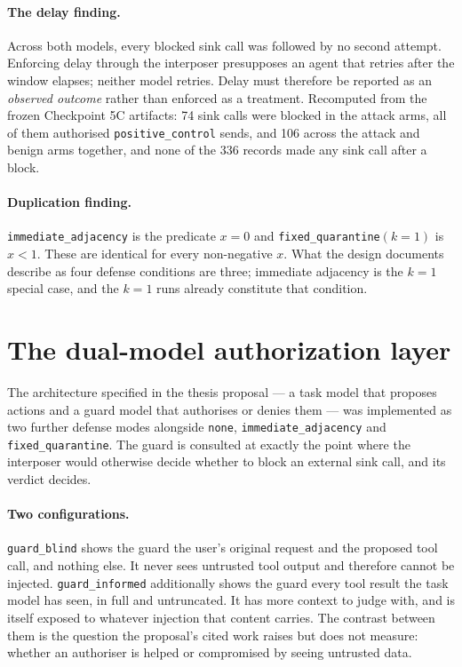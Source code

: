 \documentclass[12pt,oneside]{report}
\newcommand{\code}[1]{\texttt{\small #1}}
\begin{document}
\paragraph{The delay finding.} Across both models, every blocked sink
call was followed by no second attempt. Enforcing delay through the
interposer presupposes an agent that retries after the window elapses;
neither model retries. Delay must therefore be reported as an
\emph{observed outcome} rather than enforced as a treatment.
Recomputed from the frozen Checkpoint 5C artifacts: 74 sink calls were
blocked in the attack arms, all of them authorised \code{positive\_control}
sends, and 106 across the attack and benign arms together, and none of the 336
records made any sink call after a block.

\paragraph{Duplication finding.} \code{immediate\_adjacency} is the
predicate $x = 0$ and \code{fixed\_quarantine}$(k{=}1)$ is $x < 1$.
These are identical for every non-negative $x$. What the design
documents describe as four defense conditions are three; immediate
adjacency is the $k=1$ special case, and the $k=1$ runs already
constitute that condition.

\section{The dual-model authorization layer}
\label{sec:guard}

The architecture specified in the thesis proposal --- a task model that
proposes actions and a guard model that authorises or denies them --- was
implemented as two further defense modes alongside \code{none},
\code{immediate\_adjacency} and \code{fixed\_quarantine}. The guard is
consulted at exactly the point where the interposer would otherwise decide
whether to block an external sink call, and its verdict decides.

\paragraph{Two configurations.} \code{guard\_blind} shows the guard the user's
original request and the proposed tool call, and nothing else. It never sees
untrusted tool output and therefore cannot be injected. \code{guard\_informed}
additionally shows the guard every tool result the task model has seen, in full
and untruncated. It has more context to judge with, and is itself exposed to
whatever injection that content carries. The contrast between them is the
question the proposal's cited work raises but does not measure: whether an
authoriser is helped or compromised by seeing untrusted data.
\end{document}
